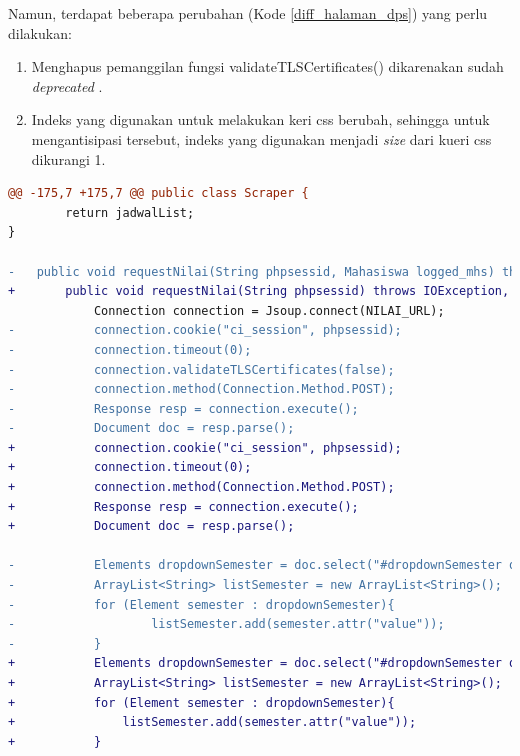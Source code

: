 \begin{itemize}
\begin{itemize}
        \end{itemize}
        Namun, terdapat beberapa perubahan (Kode \ref{diff_halaman_dps}) yang perlu dilakukan:
        \begin{enumerate}
            \item Menghapus pemanggilan fungsi validateTLSCertificates() dikarenakan sudah \textit{deprecated} \cite{jsoup}.
            \item Indeks yang digunakan untuk melakukan keri css berubah, sehingga untuk mengantisipasi tersebut, indeks yang digunakan menjadi \textit{size} dari kueri css dikurangi 1.
        \end{enumerate}
        
        
        \begin{lstlisting}[language=diff, caption=Perubahan Implementasi Jsoup Halaman Daftar Perkembangan Studi, label=diff_halaman_dps]
@@ -175,7 +175,7 @@ public class Scraper {
        return jadwalList;
}

-   public void requestNilai(String phpsessid, Mahasiswa logged_mhs) throws IOException, InterruptedException {
+       public void requestNilai(String phpsessid) throws IOException, InterruptedException {
            Connection connection = Jsoup.connect(NILAI_URL);
-           connection.cookie("ci_session", phpsessid);
-           connection.timeout(0);
-           connection.validateTLSCertificates(false);
-           connection.method(Connection.Method.POST);
-           Response resp = connection.execute();
-           Document doc = resp.parse();
+           connection.cookie("ci_session", phpsessid);
+           connection.timeout(0);
+           connection.method(Connection.Method.POST);
+           Response resp = connection.execute();
+           Document doc = resp.parse();

-           Elements dropdownSemester = doc.select("#dropdownSemester option");
-           ArrayList<String> listSemester = new ArrayList<String>();
-           for (Element semester : dropdownSemester){
-                   listSemester.add(semester.attr("value"));
-           }
+           Elements dropdownSemester = doc.select("#dropdownSemester option");
+           ArrayList<String> listSemester = new ArrayList<String>();
+           for (Element semester : dropdownSemester){
+               listSemester.add(semester.attr("value"));
+           }


\end{lstlisting}
\end{itemize}
